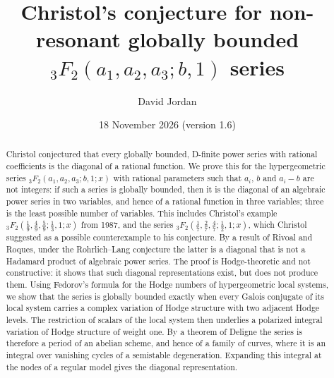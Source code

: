 \documentclass[11pt]{amsart}
\theoremstyle{definition}
\theoremstyle{remark}
\numberwithin{equation}{section}
\begin{document}
\title[Christol's conjecture for non-resonant ${}_3F_2(a;b,1)$]{Christol's conjecture for non-resonant globally bounded ${}_3F_2(a_1,a_2,a_3;b,1)$ series}

\author{David Jordan}
\address{Maynooth University Social Sciences Institute (MUSSI), Maynooth University, Maynooth, County Kildare, Ireland}

\date{18 November 2026 (version 1.6)}

\begin{abstract}
Christol conjectured that every globally bounded, D-finite power series with rational coefficients is the diagonal of a rational function. We prove this for the hypergeometric series ${}_3F_2(a_1,a_2,a_3;b,1;x)$ with rational parameters such that $a_i$, $b$ and $a_i-b$ are not integers: if such a series is globally bounded, then it is the diagonal of an algebraic power series in two variables, and hence of a rational function in three variables; three is the least possible number of variables. This includes Christol's example ${}_3F_2(\frac19,\frac49,\frac59;\frac13,1;x)$ from 1987, and the series ${}_3F_2(\frac17,\frac27,\frac47;\frac12,1;x)$, which Christol suggested as a possible counterexample to his conjecture. By a result of Rivoal and Roques, under the Rohrlich--Lang conjecture the latter is a diagonal that is not a Hadamard product of algebraic power series. The proof is Hodge-theoretic and not constructive: it shows that such diagonal representations exist, but does not produce them. Using Fedorov's formula for the Hodge numbers of hypergeometric local systems, we show that the series is globally bounded exactly when every Galois conjugate of its local system carries a complex variation of Hodge structure with two adjacent Hodge levels. The restriction of scalars of the local system then underlies a polarized integral variation of Hodge structure of weight one. By a theorem of Deligne the series is therefore a period of an abelian scheme, and hence of a family of curves, where it is an integral over vanishing cycles of a semistable degeneration. Expanding this integral at the nodes of a regular model gives the diagonal representation.
\end{abstract}

\maketitle
\end{document}
